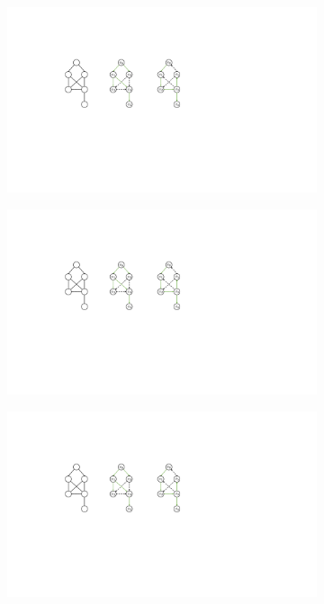 \begin{figure}[t]
\centering
\begin{subfigure}{.3\columnwidth}
\captionsetup{width=.3\columnwidth}
        \includegraphics[clip,width=\textwidth]{figures/edge_type_a_new.pdf}
\subcaption{}
\label{subfig:edge_type_a}
\end{subfigure}%
\hfill
\begin{subfigure}{.3\columnwidth}
\captionsetup{width=.9\linewidth}
        \includegraphics[clip,width=\textwidth]{figures/edge_type_b_new.pdf}
\label{subfig:edge_type_b}
\end{subfigure}
\hfill
\begin{subfigure}{.3\columnwidth}
\captionsetup{width=.9\linewidth}
        \includegraphics[clip,width=\textwidth]{figures/edge_type_c_new.pdf}

\end{subfigure}
\end{figure}
